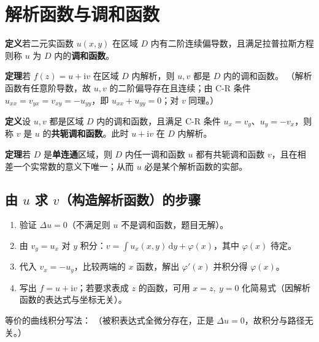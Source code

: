 
\section{解析函数与调和函数}

\textbf{定义}\quad 若二元实函数 \(u(x,y)\) 在区域 \(D\) 内有二阶连续偏导数，且满足拉普拉斯方程
则称 \(u\) 为 \(D\) 内的\textbf{调和函数}。

\textbf{定理}\quad 若 \(f(z)=u+\mathrm{i}v\) 在区域 \(D\) 内解析，则 \(u,v\) 都是 \(D\) 内的调和函数。
（解析函数有任意阶导数，故 \(u,v\) 的二阶偏导存在且连续；由 C-R 条件
\(u_{xx}=v_{yx}=v_{xy}=-u_{yy}\)，即 \(u_{xx}+u_{yy}=0\)；对 \(v\) 同理。）

\textbf{定义}\quad 设 \(u,v\) 都是区域 \(D\) 内的调和函数，且满足 C-R 条件 \(u_{x}=v_{y}\)、\(u_{y}=-v_{x}\)，则称 \(v\) 是 \(u\) 的\textbf{共轭调和函数}。此时 \(u+\mathrm{i}v\) 在 \(D\) 内解析。

\textbf{定理}\quad 若 \(D\) 是\textbf{单连通}区域，则 \(D\) 内任一调和函数 \(u\) 都有共轭调和函数 \(v\)，且在相差一个实常数的意义下唯一；从而 \(u\) 必是某个解析函数的实部。

\subsection*{由 \(u\) 求 \(v\)（构造解析函数）的步骤}
\begin{enumerate}[leftmargin=2em]
  \item 验证 \(\Delta u=0\)（不满足则 \(u\) 不是调和函数，题目无解）。
  \item 由 \(v_{y}=u_{x}\) 对 \(y\) 积分：\(v=\displaystyle\int u_{x}(x,y)\,\mathrm{d}y+\varphi(x)\)，其中 \(\varphi(x)\) 待定。
  \item 代入 \(v_{x}=-u_{y}\)，比较两端的 \(x\) 函数，解出 \(\varphi'(x)\) 并积分得 \(\varphi(x)\)。
  \item 写出 \(f=u+\mathrm{i}v\)；若要求表成 \(z\) 的函数，可用 \(x=z,\ y=0\) 化简易式（因解析函数的表达式与坐标无关）。
\end{enumerate}
等价的曲线积分写法：
（被积表达式全微分存在，正是 \(\Delta u=0\)，故积分与路径无关。）

